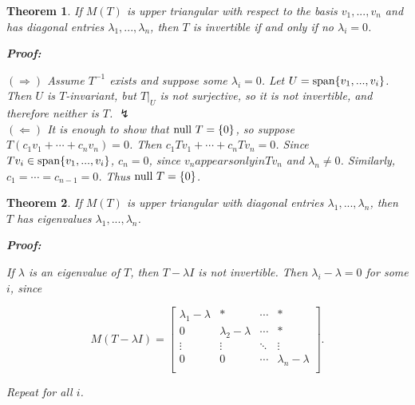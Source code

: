 \documentclass{article}
\theoremstyle{colontheorem}
\newtheorem{theorem}{Theorem}[section]
\newcommand{\Span}{\textnormal{span}}
\newcommand{\Null}{\textnormal{null }}
\newenvironment{Theorem}
{
	\begin{mdframed}[backgroundcolor=TheoremOrange!10]
	\begin{theorem}
}
{
	\end{theorem}
	\end{mdframed}
	
	\vspace{.15in}
}
\newenvironment{Proof}
{
	\begin{mdframed}[backgroundcolor=ProofPurple!10]
	\textbf{Proof:}%
}
{
	\end{mdframed}
	
	\vspace{.085in}
}
\begin{document}
\begin{Theorem}
	
	If $M(T)$ is upper triangular with respect to the basis $v_1, ..., v_n$ and has diagonal entries $\lambda_1, ..., \lambda_n$, then $T$ is invertible if and only if no $\lambda_i = 0$.
	
	\begin{Proof}
		$(\Rightarrow)$ Assume $T^{-1}$ exists and suppose some $\lambda_i = 0$. Let $U = \Span \{v_1, ..., v_i\}$. Then $U$ is $T$-invariant, but $T|_U$ is not surjective, so it is not invertible, and therefore neither is $T$. $\lightning$\\
		
		$(\Leftarrow)$ It is enough to show that $\Null T = \{0\}$, so suppose $T(c_1 v_1 + \cdots + c_n v_n) = 0$. Then $c_1 Tv_1 + \cdots + c_n Tv_n = 0$. Since $Tv_i \in \Span \{v_1, ..., v_i\}$, $c_n = 0$, since $v_n appears only in Tv_n$ and $\lambda_n \neq 0$. Similarly, $c_1 = \cdots = c_{n-1} = 0$. Thus $\Null T = \{0\}$.
		
	\end{Proof}
	
\end{Theorem}



\begin{Theorem}
	
		If $M(T)$ is upper triangular with diagonal entries $\lambda_1, ..., \lambda_n$, then $T$ has eigenvalues $\lambda_1, ..., \lambda_n$.
		
		\begin{Proof}
			If $\lambda$ is an eigenvalue of $T$, then $T - \lambda I$ is not invertible. Then $\lambda_i - \lambda = 0$ for some $i$, since
			
			$$
				M(T - \lambda I) = \begin{bmatrix}
					\lambda_1 - \lambda & * & \cdots & *\\
					0 & \lambda_2 - \lambda & \cdots & *\\
					\vdots & \vdots & \ddots & \vdots\\
					0 & 0 & \cdots & \lambda_n - \lambda\\
				\end{bmatrix}.
			$$
			
			Repeat for all $i$.
			
		\end{Proof}
	
\end{Theorem}
\end{document}
